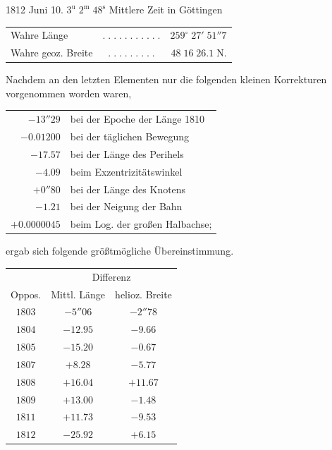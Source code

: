 1812 Juni 10. $3^{\mathrm u}\;2^{\mathrm m}\;48^{\mathrm s}$ Mittlere Zeit in Göttingen

\begin{center}\fontsize{10}{12}\selectfont\setlength{\tabcolsep}{2pt}\renewcommand{\arraystretch}{1.15}\begin{tabular}{lcr}
Wahre Länge & $.\;.\;.\;.\;.\;.\;.\;.\;.\;.\;.$ & $259^\circ\;27'\;51''7$\\
Wahre geoz. Breite & $.\;.\;.\;.\;.\;.\;.\;.\;.$ & $48\;16\;26.1\;\mathrm{N}.$\\
\end{tabular}\end{center}

\par\indent Nachdem an den letzten Elementen nur die folgenden kleinen Korrekturen vorgenommen worden waren,

\begin{center}\fontsize{10}{12}\selectfont\setlength{\tabcolsep}{4pt}\renewcommand{\arraystretch}{1.15}\begin{tabular}{rl}
$-13''29$ & bei der Epoche der Länge 1810\\
$-0.01200$ & bei der täglichen Bewegung\\
$-17.57$ & bei der Länge des Perihels\\
$-4.09$ & beim Exzentrizitätswinkel\\
$+0''80$ & bei der Länge des Knotens\\
$-1.21$ & bei der Neigung der Bahn\\
$+0.0000045$ & beim Log. der großen Halbachse;\\
\end{tabular}\end{center}

\noindent ergab sich folgende größtmögliche Übereinstimmung.

\begin{center}\fontsize{10}{12}\selectfont\setlength{\tabcolsep}{6pt}\renewcommand{\arraystretch}{1.15}\begin{tabular}{c|c|c}
& \multicolumn{2}{c}{Differenz}\\
Oppos. & Mittl. Länge & helioz. Breite\\\hline
$1803$ & $-5''06$ & $-2''78$\\
$1804$ & $-12.95$ & $-9.66$\\
$1805$ & $-15.20$ & $-0.67$\\
$1807$ & $+8.28$ & $-5.77$\\
$1808$ & $+16.04$ & $+11.67$\\
$1809$ & $+13.00$ & $-1.48$\\
$1811$ & $+11.73$ & $-9.53$\\
$1812$ & $-25.92$ & $+6.15$\\
\end{tabular}\end{center}

